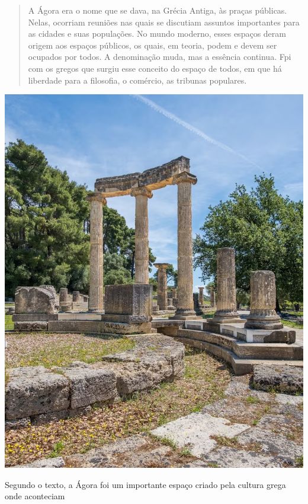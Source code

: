 \begin{minipage}{.5\textwidth}
\begin{quote}
A Ágora era o nome que se dava, na Grécia Antiga, às praças públicas. Nelas, ocorriam reuniões nas quais se discutiam assuntos importantes para as cidades e suas populações. No mundo moderno, esses espaços deram origem aos espaços públicos, os quais, em teoria, podem e devem ser ocupados por todos. 
A denominação muda, mas a essência continua. Fpi com os gregos que surgiu esse conceito do espaço de todos, em que há liberdade para a filosofia, o comércio, as tribunas populares.
\end{quote}
\end{minipage}\hspace{.5cm}
\begin{minipage}{.5\textwidth}
\includegraphics[width=\textwidth]{./imgs/img43.png}
\end{minipage}\bigskip

\noindent{}Segundo o texto, a Ágora foi um importante espaço criado pela cultura
grega onde aconteciam

